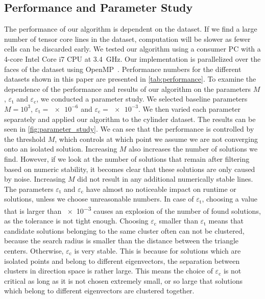 \subsection{Performance and Parameter Study} %
\label{sub:performance}
%
The performance of our algorithm is dependent on the dataset.
%
If we find a large number of tensor core lines in the dataset, computation
will be slower as fewer cells can be discarded early.
%
We tested our algorithm using a consumer PC with a 4-core Intel Core i7 \ac{CPU}
at \SI{3.4}{\giga\hertz}.
%
Our implementation is parallelized over the faces of the dataset using
OpenMP~\cite{OMP2013}.
%
Performance numbers for the different datasets shown in this paper are presented
in \cref{tab:performance}.
%
To examine the dependence of the performance and results of our algorithm on the
parameters $M$, $\varepsilon_{\mathrm{t}}$ and $\varepsilon_{\mathrm{c}}$, we
conducted a parameter study.
%
We selected baseline parameters $M = 10^3$, $\varepsilon_{\mathrm{t}} =
\num{e-6}$ and $\varepsilon_{\mathrm{c}} = \num{e-3}$.
%
We then varied each parameter separately and applied our algorithm to the
cylinder dataset.
%
The results can be seen in \cref{fig:parameter_study}.
%
We can see that the performance is controlled by the threshold $M$, which
controls at which point we assume we are not converging onto an isolated
solution.
%
Increasing $M$ also increases the number of solutions we find.
%
However, if we look at the number of solutions that remain after filtering based
on numeric stability, it becomes clear that these solutions are only caused by
noise.
%
Increasing $M$ did not result in any additional numerically stable lines.
%
The parameters $\varepsilon_{\mathrm{t}}$ and $\varepsilon_{\mathrm{c}}$ have
almost no noticeable impact on runtime or solutions, unless we choose
unreasonable numbers.
%
In case of $\varepsilon_{\mathrm{t}}$, choosing a value that is larger than
\num{e-3} causes an explosion of the number of found solutions, as the
tolerance is not tight enough.
%
Choosing $\varepsilon_{\mathrm{c}}$ smaller than $\varepsilon_{\mathrm{t}}$
means that candidate solutions belonging to the same cluster often can not be
clustered, because the search radius is smaller than the distance between the
triangle centers.
%
Otherwise, $\varepsilon_{\mathrm{c}}$ is very stable.
%
This is because for solutions which are isolated points and belong to different
eigenvectors, the separation between clusters in direction space is rather
large.
This means the choice of $\varepsilon_{\mathrm{c}}$ is not critical as
long as it is not chosen extremely small, or so large that solutions
which belong to different eigenvectors are clustered together.

